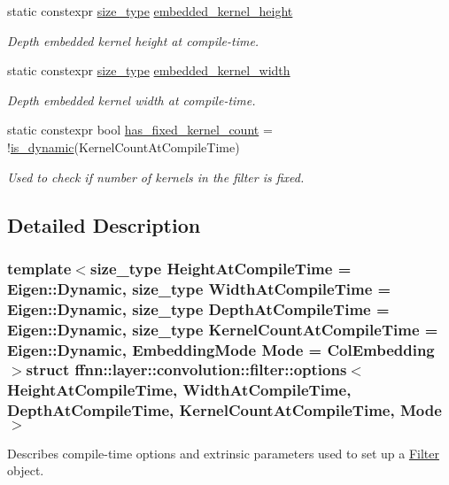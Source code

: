 \begin{DoxyCompactItemize}
static constexpr \hyperlink{namespaceffnn_a63b90a2fd70eb76684eac482a51633e5}{size\-\_\-type} \hyperlink{structffnn_1_1layer_1_1convolution_1_1filter_1_1options_a1f86b4cfe7a30523e5ff50d99708659a}{embedded\-\_\-kernel\-\_\-height}
\begin{DoxyCompactList}\small\item\em Depth embedded kernel height at compile-\/time. \end{DoxyCompactList}\item 
static constexpr \hyperlink{namespaceffnn_a63b90a2fd70eb76684eac482a51633e5}{size\-\_\-type} \hyperlink{structffnn_1_1layer_1_1convolution_1_1filter_1_1options_a9cc6dff082340e5c7388f8878ea3a7f4}{embedded\-\_\-kernel\-\_\-width}
\begin{DoxyCompactList}\small\item\em Depth embedded kernel width at compile-\/time. \end{DoxyCompactList}\item 
static constexpr bool \hyperlink{structffnn_1_1layer_1_1convolution_1_1filter_1_1options_afe85a502882816dd562acd349c96b30e}{has\-\_\-fixed\-\_\-kernel\-\_\-count} = !\hyperlink{namespaceffnn_1_1layer_a83ba223c7b7eb8e3d926b98b266f24c8}{is\-\_\-dynamic}(Kernel\-Count\-At\-Compile\-Time)
\begin{DoxyCompactList}\small\item\em Used to check if number of kernels in the filter is fixed. \end{DoxyCompactList}\end{DoxyCompactItemize}


\subsection{Detailed Description}
\subsubsection*{template$<$size\-\_\-type Height\-At\-Compile\-Time = Eigen\-::\-Dynamic, size\-\_\-type Width\-At\-Compile\-Time = Eigen\-::\-Dynamic, size\-\_\-type Depth\-At\-Compile\-Time = Eigen\-::\-Dynamic, size\-\_\-type Kernel\-Count\-At\-Compile\-Time = Eigen\-::\-Dynamic, Embedding\-Mode Mode = Col\-Embedding$>$struct ffnn\-::layer\-::convolution\-::filter\-::options$<$ Height\-At\-Compile\-Time, Width\-At\-Compile\-Time, Depth\-At\-Compile\-Time, Kernel\-Count\-At\-Compile\-Time, Mode $>$}

Describes compile-\/time options and extrinsic parameters used to set up a \hyperlink{classffnn_1_1layer_1_1convolution_1_1_filter}{Filter} object. 


